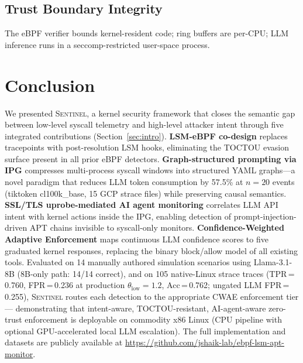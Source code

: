 \documentclass[journal]{IEEEtran}
\newcommand{\sentinel}{\textsc{Sentinel}}
\newcommand{\ipg}{IPG}
\newcommand{\cwae}{CWAE}
\newcommand{\ebpf}{eBPF}
\begin{document}
\subsection{Trust Boundary Integrity}

The \ebpf{} verifier bounds kernel-resident code; ring buffers are per-CPU;
LLM inference runs in a seccomp-restricted user-space process.

\FloatBarrier
\section{Conclusion}\label{sec:conclusion}

We presented \sentinel{}, a kernel security framework that closes the semantic
gap between low-level syscall telemetry and high-level attacker intent through
five integrated contributions (Section~\ref{sec:intro}).
\textbf{LSM-eBPF co-design} replaces tracepoints with post-resolution LSM
hooks, eliminating the TOCTOU evasion surface present in all prior eBPF
detectors.
\textbf{Graph-structured prompting via \ipg{}} compresses multi-process
syscall windows into structured YAML graphs---a novel paradigm that reduces
LLM token consumption by 57.5\% at $n{=}20$ events (tiktoken cl100k\_base,
15 GCP strace files) while preserving causal semantics.
\textbf{SSL/TLS uprobe-mediated AI agent monitoring} correlates LLM API intent
with kernel actions inside the IPG, enabling detection of prompt-injection-driven
APT chains invisible to syscall-only monitors.
\textbf{Confidence-Weighted Adaptive Enforcement} maps continuous LLM
confidence scores to five graduated kernel responses, replacing the binary
block/allow model of all existing tools.
Evaluated on 14 manually authored simulation scenarios using Llama-3.1-8B
(8B-only path: 14/14 correct), and on 105 native-Linux strace traces
(TPR\,=\,0.760, FPR\,=\,0.236 at production $\theta_{\mathrm{low}}{=}1.2$,
Acc\,=\,0.762; ungated LLM FPR\,=\,0.255), \sentinel{}
routes each detection to the appropriate \cwae{} enforcement tier ---
demonstrating that intent-aware, TOCTOU-resistant, AI-agent-aware zero-trust
enforcement is deployable on commodity x86 Linux (CPU pipeline with optional
GPU-accelerated local LLM escalation).
The full implementation and datasets are publicly available at
\url{https://github.com/jshaik-lab/ebpf-lsm-apt-monitor}.

\end{document}
